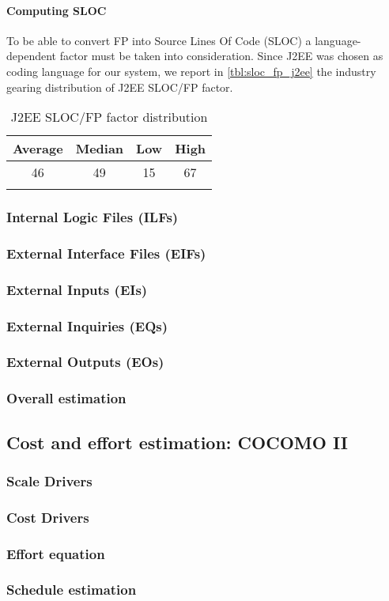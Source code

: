 \paragraph{Computing SLOC}To be able to convert FP into Source Lines Of Code (SLOC) a language-dependent factor must be taken into consideration. Since J2EE was chosen as coding language for our system, we report in \autoref{tbl:sloc_fp_j2ee} the industry gearing distribution of J2EE SLOC/FP factor. \cite{QSM}

\begin{longtable}{cccc}
\toprule
\textbf{Average} & \textbf{Median} & \textbf{Low} & \textbf{High}\\
\midrule
46 & 49 & 15 & 67\\
\bottomrule
\caption{J2EE SLOC/FP factor distribution}
\label{tbl:sloc_fp_j2ee}
\end{longtable}

\subsubsection{Internal Logic Files (ILFs)}

\subsubsection{External Interface Files (EIFs)}

\subsubsection{External Inputs (EIs)}

\subsubsection{External Inquiries (EQs)}
 
\subsubsection{External Outputs (EOs)} 

\subsubsection{Overall estimation}

\subsection{Cost and effort estimation: COCOMO II} 

\subsubsection{Scale Drivers}

\subsubsection{Cost Drivers}

\subsubsection{Effort equation}

\subsubsection{Schedule estimation }
